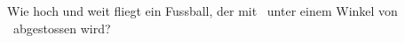 Wie hoch und weit fliegt ein Fussball, der mit \vfO\ unter einem Winkel von \alO\ abgestossen wird?

